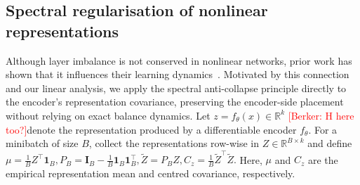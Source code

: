 \documentclass{article} %
\theoremstyle{remark}
\newcommand{\BD}[1]{\textcolor{red}{[Berker: #1]}}
\begin{document}
\subsection{Spectral regularisation of nonlinear representations}
\label{sec:logdet-covariance-regulariser}
Although layer imbalance is not conserved in nonlinear networks, prior work has shown that it influences their learning dynamics~\citep{kunin_2024_get,anguita2026theory,jarvis2025theory}.
Motivated by this connection and our linear analysis, we apply
the spectral anti-collapse principle directly to the encoder's
representation covariance, preserving the encoder-side placement
without relying on exact balance dynamics. Let $z=f_\theta(x)\in\mathbb{R}^{k}$ \BD{H here too?}denote the representation
produced by a differentiable encoder $f_\theta$.
For a minibatch of size $B$, collect the representations row-wise
in $Z\in\mathbb{R}^{B\times k}$ and define $\mu=\frac{1}{B}Z^\top\mathbf{1}_B,
$\text{ }$
P_B=\mathbf{I}_B-\frac{1}{B}\mathbf{1}_B\mathbf{1}_B^\top,
$\text{ }$
\widetilde Z=P_BZ,
$\text{ }$
C_z=\frac{1}{B}\widetilde Z^\top\widetilde Z.$
Here, $\mu$ and $C_z$ are the empirical representation mean
and centred covariance, respectively.
\end{document}
